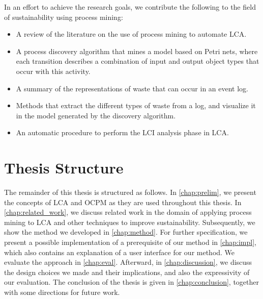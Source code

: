 In an effort to achieve the research goals, we contribute the following to the field of sustainability using process mining:
\begin{itemize}
    \item A review of the literature on the use of process mining to automate LCA.
	\item A process discovery algorithm that mines a model based on Petri nets, where each transition describes a combination of input and output object types that occur with this activity.
	\item A summary of the representations of waste that can occur in an event log.
	\item Methods that extract the different types of waste from a log, and visualize it in the model generated by the discovery algorithm.
    \item An automatic procedure to perform the LCI analysis phase in LCA.
\end{itemize}



\section{Thesis Structure}

The remainder of this thesis is structured as follows.
In \cref{chap:prelim}, we present the concepts of LCA and OCPM as they are used throughout this thesis.
In \cref{chap:related_work}, we discuss related work in the domain of applying process mining to LCA and other techniques to improve sustainability.
Subsequently, we show the method we developed in \cref{chap:method}.
For further specification, we present a possible implementation of a prerequisite of our method in \cref{chap:impl}, which also contains an explanation of a user interface for our method.
We evaluate the approach in \cref{chap:eval}.
Afterward, in \cref{chap:discussion}, we discuss the design choices we made and their implications, and also the expressivity of our evaluation.
The conclusion of the thesis is given in \cref{chap:conclusion}, together with some directions for future work.

